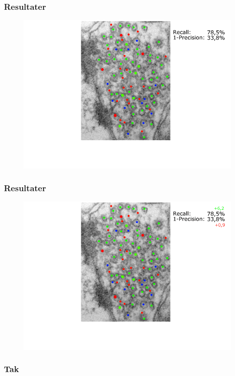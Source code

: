 \documentclass[12pt,t]{beamer}
\begin{document}
\begin{frame}
\frametitle{Resultater}
\begin{figure}[H]
	\centering
	\includegraphics[scale=0.4]{img/afstand/res_4.png}
\end{figure}
\end{frame}

\begin{frame}
\frametitle{Resultater}
\begin{figure}[H]
	\centering
	\includegraphics[scale=0.4]{img/afstand/res_5.png}
\end{figure}
\end{frame}

\begin{frame}
\frametitle{Tak}
\end{frame}
\end{document}
